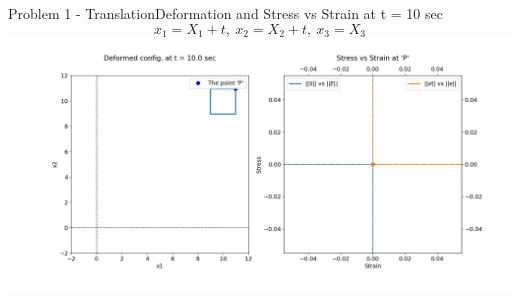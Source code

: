 \documentclass{beamer}
\begin{document}
\begin{frame}{Problem 1 - Translation}{Deformation and Stress vs Strain at t = 10 sec}
    \vspace{-1em}
    \scriptsize $$x_1 = X_1+t,\ x_2 = X_2+t,\ x_3 = X_3$$
    \includegraphics[width=\textwidth, trim={4.5cm 2cm 3cm 1cm}, clip]{Plots/translation.jpg}
\end{frame}
\end{document}
